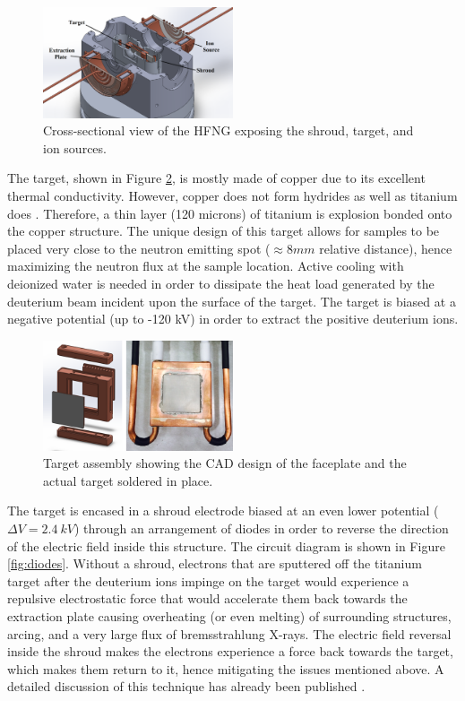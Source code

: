 \documentclass[review]{elsarticle}
\begin{document}
\begin{figure}
	\centering
	\includegraphics[width=0.5\textwidth]{pics/cutaway}
	\caption{Cross-sectional view of the HFNG exposing the shroud, target, and ion sources.}
	\label{fig:HFNG}
\end{figure}
	
The target, shown in Figure \ref{fig:new_target}, is mostly made of copper due to its excellent thermal conductivity. However, copper does not form hydrides as well as titanium does \cite{CRC}. Therefore, a thin layer (120 microns) of titanium is explosion bonded onto the copper structure. The unique design of this target allows for samples to be placed very close to the neutron emitting spot ($\approx 8 mm$ relative distance), hence maximizing the neutron flux at the sample location. Active cooling with deionized water is needed in order to dissipate the heat load generated by the deuterium beam incident upon the surface of the target. The target is biased at a negative potential (up to -120 kV) in order to extract the positive deuterium ions.

\begin{figure}
	\centering
	\includegraphics[width=0.5\textwidth]{pics/new_target}
	\caption{Target assembly showing the CAD design of the faceplate and the actual target soldered in place.}
	\label{fig:new_target}
\end{figure}
	
The target is encased in a shroud electrode biased at an even lower potential ($\Delta V=2.4\ kV$) through an arrangement of diodes in order to reverse the direction of the electric field inside this structure. The circuit diagram is shown in Figure \ref{fig:diodes}. Without a shroud, electrons that are sputtered off the titanium target after the deuterium ions impinge on the target would experience a repulsive electrostatic force that would accelerate them back towards the extraction plate causing overheating (or even melting) of surrounding structures, arcing, and a very large flux of bremsstrahlung X-rays. The electric field reversal inside the shroud makes the electrons experience a force back towards the target, which makes them return to it, hence mitigating the issues mentioned above. A detailed discussion of this technique has already been published \cite{electronSup}. 
\end{document}

